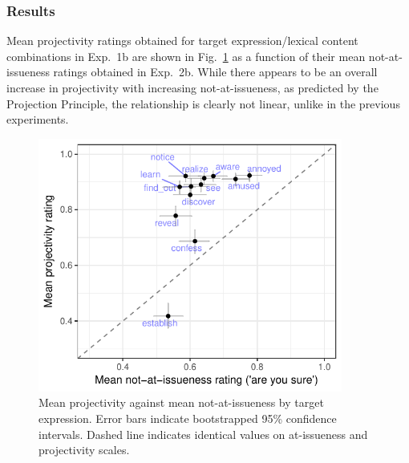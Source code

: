 \documentclass[11pt,fleqn]{article}
\newcommand{\6}{\mbox{$[\hspace*{-.6mm}[$}}
\newcommand{\9}{\mbox{$]\hspace*{-.6mm}]$}}
\newcommand{\figref}[1]{Fig.~\ref{#1}}
\begin{document}
\subsubsection{Results}

Mean projectivity ratings obtained for target expression/lexical content combinations in Exp.~1b are shown in \figref{fig:f-proj-ai-2b} as a function of their mean not-at-issueness ratings obtained in Exp.~2b. While there appears to be an overall increase in projectivity with increasing not-at-issueness, as predicted by the Projection Principle, the relationship is clearly not linear, unlike in the previous experiments. 

\begin{figure}[!h]

\begin{center}
\includegraphics[width=10cm]{../results/exp2b/graphs/ai-proj-bytrigger-labels}
\end{center}

\caption{Mean projectivity against mean not-at-issueness by target expression. Error bars indicate bootstrapped 95\% confidence intervals. Dashed line indicates identical values on at-issueness and projectivity scales.}
\label{fig:f-proj-ai-2b}
\end{figure}


%
%
%
%
%
\end{document}
